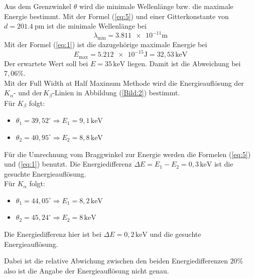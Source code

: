 Aus dem Grenzwinkel $\theta$ wird die minimale Wellenlänge bzw. die maximale Energie bestimmt.
Mit der Formel (\ref{eq:5}) und einer Gitterkonstante von $d= \SI{201.4}{\pico\meter}$  ist die minimale Wellenlänge bei
\begin{equation*}
  \lambda_{\text{min}} = \num{3.811e-11} \text{m}
\end{equation*}
Mit der Formel (\ref{eq:1}) ist die dazugehörige maximale Energie bei
\begin{equation*}
  E_{\text{max}} = \num{5.212e-15} \text{J} = 32,53 \, \text{keV}
\end{equation*}
Der erwartete Wert soll bei $E = 35 \,\text{keV}$ liegen.
Damit ist die Abweichung bei $7,06 \%$.\\

Mit der Full Width at Half Maximum Methode wird die Energieauflösung der $K_\alpha \text{- und der} \, K_\beta \text{-Linien}$ in Abbildung (\ref{Bild:2}) bestimmt.\\
Für $K_\beta$ folgt:
\begin{itemize}
  \item $\theta_1 = 39,52^\circ \Rightarrow E_1 = 9,1 \, \text{keV}$
  \item $\theta_2 = 40,95^\circ \Rightarrow E_2 = 8,8 \, \text{keV}$
\end{itemize}
Für die Umrechnung vom Braggwinkel zur Energie werden die Formelen (\ref{eq:5}) und (\ref{eq:1}) benutzt.
Die Energiedifferenz $\Delta E = E_1 - E_2 = 0,3 \, \text{keV}$ ist die gesuchte Energieauflösung.\\

Für $K_\alpha$ folgt:
\begin{itemize}
  \item $\theta_1 = 44,05^\circ \Rightarrow E_1 = 8,2 \, \text{keV}$
  \item $\theta_2 = 45,24^\circ \Rightarrow E_2 = 8 \, \text{keV}$
\end{itemize}
Die Energiedifferenz hier ist bei $\Delta E = 0,2 \,\text{keV}$ und die gesuchte Energieauflösung.

Dabei ist die relative Abwichung zwischen den beiden Energiedifferenzen $20 \%$ also
ist die Angabe der Energieauflösung nicht genau.

